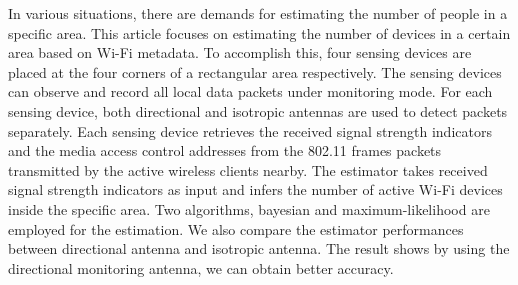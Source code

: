 \TAMUAbstractFormat

In various situations, there are demands for estimating the number of people in a specific area. This article focuses on estimating the number of devices in a certain area based on Wi-Fi metadata. To accomplish this, four sensing devices are placed at the four corners of a rectangular area respectively. The sensing devices can observe and record all local data packets under monitoring mode. For each sensing device, both directional and isotropic antennas are used to detect packets separately. Each sensing device retrieves the received signal strength indicators and the media access control  addresses from the 802.11 frames packets transmitted by the active wireless clients nearby.
The estimator takes received signal strength indicators as input and infers the number of active Wi-Fi devices inside the specific area. Two algorithms, bayesian and maximum-likelihood are employed for the estimation.
We also compare the estimator performances between directional antenna and isotropic antenna. The result shows by using the directional monitoring antenna, we can obtain better accuracy.
